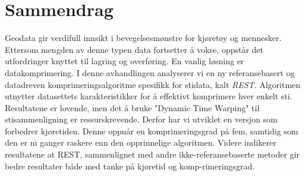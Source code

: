 \chapter*{Sammendrag}

Geodata gir verdifull innsikt i bevegelsesmønstre for kjøretøy og mennesker. Ettersom mengden av denne typen data fortsetter å vokse, oppstår det utfordringer knyttet til lagring og overføring. En vanlig løsning er datakomprimering. I denne avhandlingen analyserer vi en ny referansebasert og datadreven komprimeringsalgoritme spesifikk for stidata, kalt \textit{REST}. Algoritmen utnytter datasettets karakteristikker for å effektivt komprimere hver enkelt sti. Resultatene er lovende, men det å bruke "Dynamic Time Warping" til stisammenligning er ressurskrevende. Derfor har vi utviklet en versjon som forbedrer kjøretiden. Denne oppnår en komprimeringsgrad på fem, samtidig som den er ni ganger raskere enn den opprinnelige algoritmen. Videre indikerer resultatene at REST, sammenlignet med andre ikke-referansebaserte metoder gir bedre resultater både med tanke på kjøretid og komp-rimeringsgrad.
